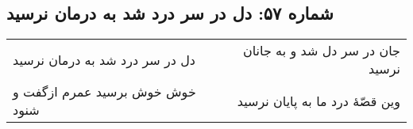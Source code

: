 \begin{center}
\section*{شماره ۵۷: دل در سر درد شد به درمان نرسید}
\label{sec:057}
\begin{longtable}{l p{0.5cm} r}
دل در سر درد شد به درمان نرسید
&&
جان در سر دل شد و به جانان نرسید
\\
خوش خوش برسید عمرم ازگفت و شنود
&&
وین قصّهٔ درد ما به پایان نرسید
\\
\end{longtable}
\end{center}
